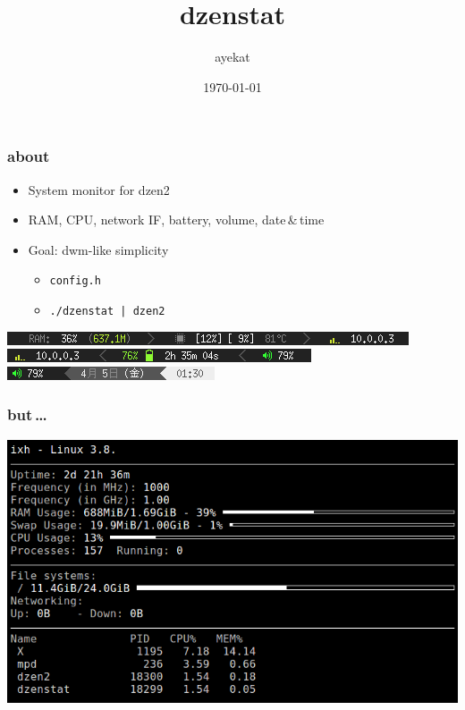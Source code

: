 \documentclass{beamer}
\title{dzenstat}
\author{ayekat}
\date{\today}
\begin{document}
\maketitle

\begin{frame}[fragile]
  \frametitle{about}
  \begin{itemize}
    \pause\item System monitor for dzen2
    \pause\item RAM, CPU, network IF, battery, volume, date\,\&\,time
    \pause\item Goal: dwm-like simplicity
    \begin{itemize}
      \pause\item \verb+config.h+
      \pause\item \verb+./dzenstat | dzen2+
    \end{itemize}
  \end{itemize}
  \pause
  \begin{center}
    \includegraphics[height=.8em]{img/dzenstat1.png}\\
    \includegraphics[height=.8em]{img/dzenstat2.png}\\
    \includegraphics[height=.8em]{img/dzenstat3.png}
  \end{center}
\end{frame}

\begin{frame}
  \frametitle{but\,\dots}
  \pause\includegraphics[width=\textwidth]{img/conky.png}
\end{frame}
\end{document}
